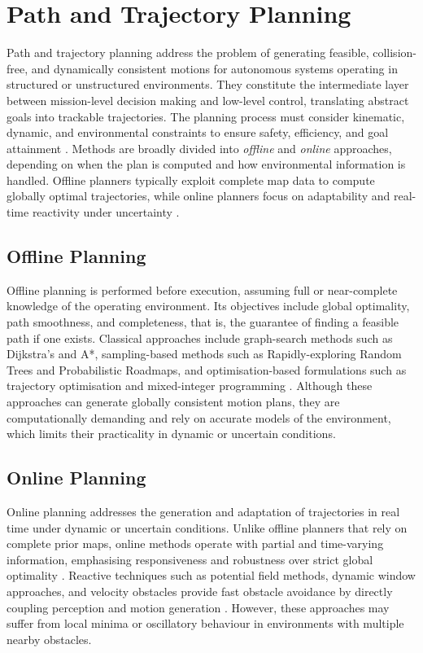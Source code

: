 \section{Path and Trajectory Planning}

Path and trajectory planning address the problem of generating feasible, collision-free, and dynamically consistent motions for autonomous systems operating in structured or unstructured environments.
They constitute the intermediate layer between mission-level decision making and low-level control, translating abstract goals into trackable trajectories.
The planning process must consider kinematic, dynamic, and environmental constraints to ensure safety, efficiency, and goal attainment \cite{chosetPrinciplesRobotMotion2005,lavallePlanningAlgorithms2006}.
Methods are broadly divided into \textit{offline} and \textit{online} approaches, depending on when the plan is computed and how environmental information is handled.
Offline planners typically exploit complete map data to compute globally optimal trajectories, while online planners focus on adaptability and real-time reactivity under uncertainty \cite{sicilianoSpringerHandbookRobotics2016}.

\subsection{Offline Planning}

Offline planning is performed before execution, assuming full or near-complete knowledge of the operating environment.
Its objectives include global optimality, path smoothness, and completeness, that is, the guarantee of finding a feasible path if one exists.
Classical approaches include graph-search methods such as Dijkstra’s and A*, sampling-based methods such as Rapidly-exploring Random Trees and Probabilistic Roadmaps, and optimisation-based formulations such as trajectory optimisation and mixed-integer programming \cite{chosetPrinciplesRobotMotion2005,lavallePlanningAlgorithms2006}.
Although these approaches can generate globally consistent motion plans, they are computationally demanding and rely on accurate models of the environment, which limits their practicality in dynamic or uncertain conditions.

\subsection{Online Planning} 

Online planning addresses the generation and adaptation of trajectories in real time under dynamic or uncertain conditions.
Unlike offline planners that rely on complete prior maps, online methods operate with partial and time-varying information, emphasising responsiveness and robustness over strict global optimality \cite{sicilianoSpringerHandbookRobotics2016,lavallePlanningAlgorithms2006}.
Reactive techniques such as potential field methods, dynamic window approaches, and velocity obstacles provide fast obstacle avoidance by directly coupling perception and motion generation \cite{foxDynamicWindowApproach1997,fioriniMotionPlanningDynamic1998}.
However, these approaches may suffer from local minima or oscillatory behaviour in environments with multiple nearby obstacles.

